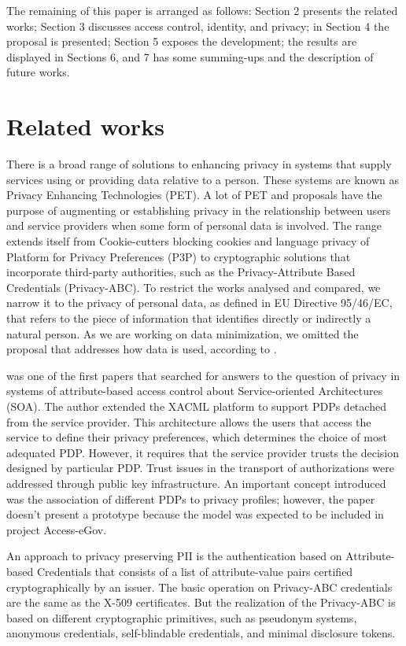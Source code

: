 \documentclass{doublecol-new}
\begin{document}
The remaining of this paper is arranged as follows: Section 2 presents the related works; Section 3 discusses access control, identity, and privacy; in Section 4 the proposal is presented; Section 5 exposes the development; the results are displayed in Sections 6, and 7 has some summing-ups and the description of future works.

\section{Related works}
There is a broad range of solutions to enhancing privacy in systems that supply services using or providing data relative to a person. These systems are known as Privacy Enhancing Technologies (PET). A lot of PET and proposals have the purpose of augmenting or establishing privacy in the relationship between users and service providers when some form of personal data is involved. The range extends itself from Cookie-cutters blocking cookies and language privacy of Platform for Privacy Preferences (P3P) to cryptographic solutions that incorporate third-party authorities, such as the Privacy-Attribute Based Credentials (Privacy-ABC). To restrict the works analysed and compared, we narrow it to the privacy of personal data, as defined in EU Directive 95/46/EC\cite{directive199595}, that refers to the piece of information that identifies directly or indirectly a natural person. As we are working on data minimization, we omitted the proposal that addresses how data is used, according to \citep{mondal2014beyond}.

\citep{kolter2007privacy} was one of the first papers that searched for answers to the question of privacy in systems of attribute-based access control about Service-oriented Architectures (SOA). The author extended the XACML platform to support PDPs detached from the service provider. This architecture allows the users that access the service to define their privacy preferences, which determines the choice of  most adequated PDP. However, it requires that the service provider trusts the decision designed by particular PDP. Trust issues in the transport of authorizations were addressed through public key infrastructure. An important concept introduced was the association of different PDPs to privacy profiles; however, the paper doesn't present a prototype because the model was expected to be included in project Access-eGov\cite{pernulAccesseGov}.


An approach to privacy preserving PII is the authentication based on Attribute-based Credentials that consists of a list of attribute-value pairs certified cryptographically by an issuer. The basic operation on Privacy-ABC credentials are the same as the X-509 certificates. But the realization of the Privacy-ABC is based on different cryptographic primitives, such as pseudonym systems\citep{chaum1981untraceable}, anonymous credentials\citep{camenisch2001efficient}, self-blindable credentials\citep{verheul2001self}, and minimal disclosure tokens\citep{brands2000rethinking}.
\end{document}
